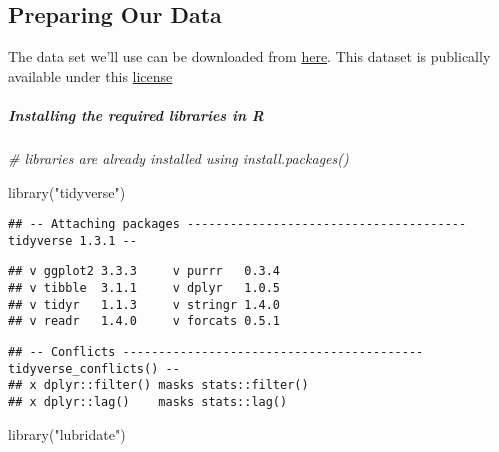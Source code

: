 \documentclass[
]{article}
\newenvironment{Shaded}{\begin{snugshade}}{\end{snugshade}}
\newcommand{\CommentTok}[1]{\textcolor[rgb]{0.56,0.35,0.01}{\textit{#1}}}
\newcommand{\FunctionTok}[1]{\textcolor[rgb]{0.00,0.00,0.00}{#1}}
\newcommand{\NormalTok}[1]{#1}
\newcommand{\StringTok}[1]{\textcolor[rgb]{0.31,0.60,0.02}{#1}}
\begin{document}
\hypertarget{preparing-our-data}{%
\subsection{Preparing Our Data}\label{preparing-our-data}}

The data set we'll use can be downloaded from
\href{https://divvy-tripdata.s3.amazonaws.com/index.html}{here}. This
dataset is publically available under this
\href{https://www.divvybikes.com/data-license-agreement}{license}

\hypertarget{installing-the-required-libraries-in-r}{%
\subparagraph{Installing the required libraries in
R}\label{installing-the-required-libraries-in-r}}

\begin{Shaded}
\begin{Highlighting}[]
\CommentTok{\# libraries are already installed using install.packages()}
\end{Highlighting}
\end{Shaded}

\begin{Shaded}
\begin{Highlighting}[]
\FunctionTok{library}\NormalTok{(}\StringTok{"tidyverse"}\NormalTok{)}
\end{Highlighting}
\end{Shaded}

\begin{verbatim}
## -- Attaching packages --------------------------------------- tidyverse 1.3.1 --
\end{verbatim}

\begin{verbatim}
## v ggplot2 3.3.3     v purrr   0.3.4
## v tibble  3.1.1     v dplyr   1.0.5
## v tidyr   1.1.3     v stringr 1.4.0
## v readr   1.4.0     v forcats 0.5.1
\end{verbatim}

\begin{verbatim}
## -- Conflicts ------------------------------------------ tidyverse_conflicts() --
## x dplyr::filter() masks stats::filter()
## x dplyr::lag()    masks stats::lag()
\end{verbatim}

\begin{Shaded}
\begin{Highlighting}[]
\FunctionTok{library}\NormalTok{(}\StringTok{"lubridate"}\NormalTok{)}
\end{Highlighting}
\end{Shaded}
\end{document}
